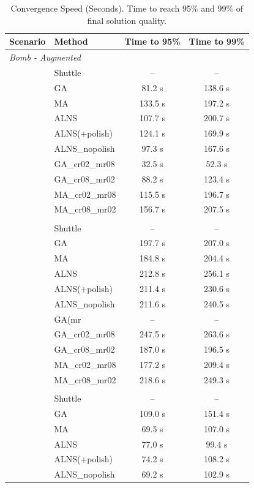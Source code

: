 \begin{table}[h]
\centering
\caption{Convergence Speed (Seconds). Time to reach 95\% and 99\% of final solution quality.}
\label{tab:convergence}
\begin{tabular}{llcc}
\toprule
\textbf{Scenario} & \textbf{Method} & \textbf{Time to 95\%} & \textbf{Time to 99\%} \\
\midrule
\multicolumn{4}{l}{\textit{Bomb - Augmented}} \\
 & Shuttle & -- & -- \\
 & GA & 81.2 s & 138.6 s \\
 & MA & 133.5 s & 197.2 s \\
 & ALNS & 107.7 s & 200.7 s \\
 & ALNS(+polish) & 124.1 s & 169.9 s \\
 & ALNS_nopolish & 97.3 s & 167.6 s \\
 & GA_cr02_mr08 & 32.5 s & 52.3 s \\
 & GA_cr08_mr02 & 88.2 s & 123.4 s \\
 & MA_cr02_mr08 & 115.5 s & 196.7 s \\
 & MA_cr08_mr02 & 156.7 s & 207.5 s \\
\addlinespace
\multicolumn{4}{l}{\textit{Bomb - Specialized}} \\
 & Shuttle & -- & -- \\
 & GA & 197.7 s & 207.0 s \\
 & MA & 184.8 s & 204.4 s \\
 & ALNS & 212.8 s & 256.1 s \\
 & ALNS(+polish) & 211.4 s & 230.6 s \\
 & ALNS_nopolish & 211.6 s & 240.5 s \\
 & GA(mr & -- & -- \\
 & GA_cr02_mr08 & 247.5 s & 263.6 s \\
 & GA_cr08_mr02 & 187.0 s & 196.5 s \\
 & MA_cr02_mr08 & 177.2 s & 209.4 s \\
 & MA_cr08_mr02 & 218.6 s & 249.3 s \\
\addlinespace
\multicolumn{4}{l}{\textit{Default - Standard}} \\
 & Shuttle & -- & -- \\
 & GA & 109.0 s & 151.4 s \\
 & MA & 69.5 s & 107.0 s \\
 & ALNS & 77.0 s & 99.4 s \\
 & ALNS(+polish) & 74.2 s & 108.2 s \\
 & ALNS_nopolish & 69.2 s & 102.9 s \\

\end{tabular}
\end{table}
